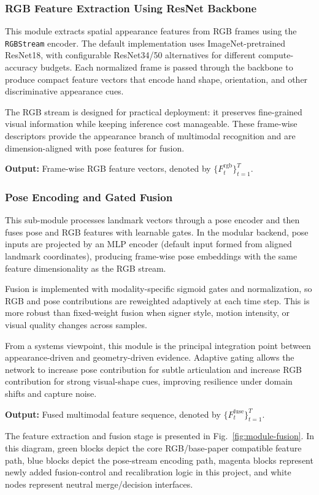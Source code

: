 \subsubsection{RGB Feature Extraction Using ResNet Backbone}
This module extracts spatial appearance features from RGB frames using the \texttt{RGBStream} encoder. The default implementation uses ImageNet-pretrained ResNet18, with configurable ResNet34/50 alternatives for different compute-accuracy budgets. Each normalized frame is passed through the backbone to produce compact feature vectors that encode hand shape, orientation, and other discriminative appearance cues.

The RGB stream is designed for practical deployment: it preserves fine-grained visual information while keeping inference cost manageable. These frame-wise descriptors provide the appearance branch of multimodal recognition and are dimension-aligned with pose features for fusion.

\textbf{Output:} Frame-wise RGB feature vectors, denoted by $\{F_t^{\mathrm{rgb}}\}_{t=1}^{T}$.

\subsubsection{Pose Encoding and Gated Fusion}
This sub-module processes landmark vectors through a pose encoder and then fuses pose and RGB features with learnable gates. In the modular backend, pose inputs are projected by an MLP encoder (default input formed from aligned landmark coordinates), producing frame-wise pose embeddings with the same feature dimensionality as the RGB stream.

Fusion is implemented with modality-specific sigmoid gates and normalization, so RGB and pose contributions are reweighted adaptively at each time step. This is more robust than fixed-weight fusion when signer style, motion intensity, or visual quality changes across samples.

From a systems viewpoint, this module is the principal integration point between appearance-driven and geometry-driven evidence. Adaptive gating allows the network to increase pose contribution for subtle articulation and increase RGB contribution for strong visual-shape cues, improving resilience under domain shifts and capture noise.

\textbf{Output:} Fused multimodal feature sequence, denoted by $\{F_t^{\mathrm{fuse}}\}_{t=1}^{T}$.

The feature extraction and fusion stage is presented in Fig.~\ref{fig:module-fusion}. In this diagram, green blocks depict the core RGB/base-paper compatible feature path, blue blocks depict the pose-stream encoding path, magenta blocks represent newly added fusion-control and recalibration logic in this project, and white nodes represent neutral merge/decision interfaces.

